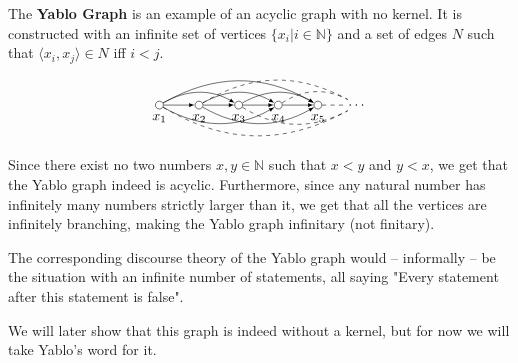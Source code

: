 The \textbf{Yablo Graph} \cite{analysis-yablo} is an example of an acyclic graph with no kernel. It is constructed with an infinite set of vertices $\{ x_i | i \in \mathbb{N} \}$ and a set of edges $N$ such that $\langle x_i, x_j \rangle \in N$ iff $i < j$.
\[
  \begin{tikzpicture}
    [
    point/.style={circle,draw,inner sep=0pt,minimum size=2mm},
    collection/.style={thick,rectangle,draw,inner sep=0pt,minimum height=14mm, minimum width= 9mm}
    ]
    \node (1) at (0,1) [point,label=below:$x_1$] {};
    \node (2) at (1,1) [point,label=below:$x_2$] {};
    \node (3) at (2,1) [point,label=below:$x_3$] {};
    \node (4) at (3,1) [point,label=below:$x_4$] {};
    \node (5) at (4,1) [point,label=below:$x_5$] {};
    \node (6) at (5,1) [] {$\dots$};
    \draw [-latex] (1) to (2);
    \draw [-latex] (2) to (3);
    \draw [-latex] (3) to (4);
    \draw [-latex] (4) to (5);
    \draw [dashed] (5) to (6);
    \draw [-latex, bend left] (1) to (3);
    \draw [-latex, bend left] (2) to (4);
    \draw [-latex, bend left] (3) to (5);
    \draw [dashed, bend left] (4) to (6);
    \draw [-latex, bend right] (1) to (4);
    \draw [-latex, bend right] (2) to (5);
    \draw [dashed, bend right] (3) to (6);
    \draw [-latex, bend left] (1) to (5);
    \draw [dashed, bend left] (2) to (6);
    \draw [dashed, bend right] (1) to (6);
  \end{tikzpicture}
\]
Since there exist no two numbers $x,y \in \mathbb{N}$ such that $x < y$ and $y < x$, we get that the Yablo graph indeed is acyclic.
Furthermore, since any natural number has infinitely many numbers strictly larger than it, we get that all the vertices are infinitely branching, making the Yablo graph infinitary (not finitary).

The corresponding discourse theory of the Yablo graph would -- informally -- be the situation with an infinite number of statements, all saying "Every statement after this statement is false".

We will later show that this graph is indeed without a kernel, but for now we will take Yablo's word \cite{analysis-yablo} for it.

